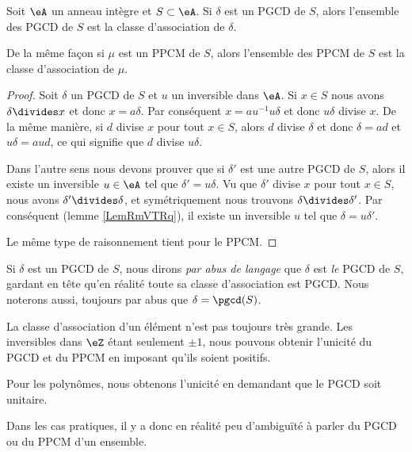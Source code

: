\begin{lemma}
    Soit \( \eA\) un anneau intègre et \( S\subset \eA\). Si \( \delta\) est un PGCD de \( S\), alors l'ensemble des PGCD de \( S\) est la classe d'association de \( \delta\).

    De la même façon si \( \mu\) est un PPCM de \( S\), alors l'ensemble des PPCM de \( S\) est la classe d'association de \( \mu\).
\end{lemma}

\begin{proof}
    Soit \( \delta\) un PGCD de \( S\) et \( u\) un inversible dans \( \eA\). Si \( x\in S\) nous avons \( \delta\divides x\) et donc \( x=a\delta\). Par conséquent \( x=au^{-1}u\delta\) et donc \( u\delta\) divise \( x\). De la même manière, si \( d\) divise \( x\) pour tout \( x\in S\), alors \( d\) divise \( \delta\) et donc \( \delta=ad\) et \( u\delta=aud\), ce qui signifie que \( d\) divise \( u\delta\).

    Dans l'autre sens nous devons prouver que si \( \delta'\) est une autre PGCD de \( S\), alors il existe un inversible \( u\in \eA\) tel que \( \delta'=u\delta\). Vu que \( \delta'\) divise \( x\) pour tout \( x\in S\), nous avons \( \delta'\divides \delta\), et symétriquement nous trouvons \( \delta\divides\delta'\). Par conséquent (lemme \ref{LemRmVTRq}), il existe un inversible \( u\) tel que \( \delta=u\delta'\).

    Le même type de raisonnement tient pour le PPCM.
\end{proof}

Si \( \delta\) est un PGCD de \( S\), nous dirons \emph{par abus de langage} que \( \delta\) est \emph{le} PGCD de \( S\), gardant en tête qu'en réalité toute sa classe d'association est PGCD. Nous noterons aussi, toujours par abus que \( \delta=\pgcd(S)\).

\begin{remark}
    La classe d'association d'un élément n'est pas toujours très grande. Les inversibles dans \( \eZ\) étant seulement \( \pm 1\), nous pouvons obtenir l'unicité du PGCD et du PPCM en imposant qu'ils soient positifs.

    Pour les polynômes, nous obtenons l'unicité en demandant que le PGCD soit unitaire.

    Dans les cas pratiques, il y a donc en réalité peu d'ambiguïté à parler du PGCD ou du PPCM d'un ensemble.
\end{remark}

